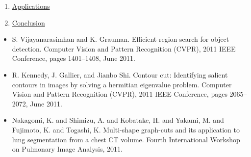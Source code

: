\documentclass[11pt, a4paper, landscape]{article}
\begin{document}
\begin{enumerate}
\item \hyperlink{sli:application}{Applications}
\item \hyperlink{sli:conclusion}{Conclusion}
\end{enumerate}
\vfill


\NewPage{} 
\vfill 
\begin{itemize}
\item S. Vijayanarasimhan and K. Grauman. \alert{Efficient region search for object detection.} Computer Vision and Pattern Recognition (CVPR), 2011 IEEE Conference, pages 1401--1408, June 2011.
\item R. Kennedy, J. Gallier, and Jianbo Shi. \alert{Contour cut: Identifying salient contours in images
by solving a hermitian eigenvalue problem.} Computer Vision and Pattern Recognition (CVPR), 2011 IEEE Conference, pages 2065--2072, June 2011.
\item Nakagomi, K. and Shimizu, A. and Kobatake, H. and Yakami, M. and Fujimoto, K. and Togashi, K. \alert{Multi-shape graph-cuts and its application to lung segmentation from a chest CT volume.} Fourth International Workshop on Pulmonary Image Analysis, 2011.
\end{itemize}
\nocite{*}
\vfill


\NewPage
\footnotesize


\end{document}
